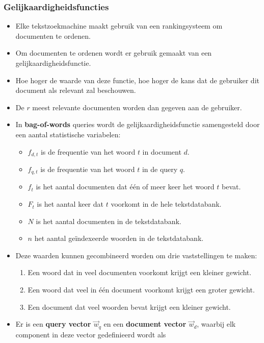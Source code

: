 \subsubsection{Gelijkaardigheidsfuncties}
\begin{itemize}
    \item Elke tekstzoekmachine maakt gebruik van een rankingsysteem om documenten te ordenen.
    \item Om documenten te ordenen wordt er gebruik gemaakt van een gelijkaardigheidsfunctie.
    \item Hoe hoger de waarde van deze functie, hoe hoger de kans dat de gebruiker dit document als relevant zal beschouwen.
    \item De $r$ meest relevante documenten worden dan gegeven aan de gebruiker.
    \item In \textbf{bag-of-words} queries wordt de gelijkaardigheidsfunctie samengesteld door een aantal statistische variabelen:
    \begin{itemize}
        \item $f_{d, t}$ is de frequentie van het woord $t$ in document $d$.
        \item $f_{q, t}$ is de frequentie van het woord $t$ in de query $q$.
        \item $f_t$ is het aantal documenten dat één of meer keer het woord $t$ bevat.
        \item $F_t$ is het aantal keer dat $t$ voorkomt in de hele tekstdatabank.
        \item $N$ is het aantal documenten in de tekstdatabank.
        \item $n$ het aantal geïndexeerde woorden in de tekstdatabank.
    \end{itemize}
    \item Deze waarden kunnen gecombineerd worden om drie vaststellingen te maken:
    \begin{enumerate}
        \item Een woord dat in veel documenten voorkomt krijgt een kleiner gewicht.
        \item Een woord dat veel in één document voorkomt krijgt een groter gewicht.
        \item Een document dat veel woorden bevat krijgt een kleiner gewicht. 
    \end{enumerate}
    \item Er is een \textbf{query vector $\vec{w}_q$} en een \textbf{document vector $\vec{w}_d$}, waarbij elk component in deze vector gedefinieerd wordt als

\end{itemize}
